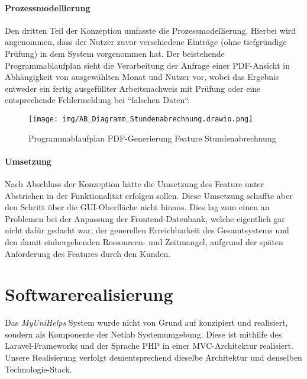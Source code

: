 \documentclass[12pt,a4paper]{scrartcl}
\newcommand{\italic}[1]{\textit{#1}}
\begin{document}
\paragraph*{Prozessmodellierung}

Den dritten Teil der Konzeption umfasste die Prozessmodellierung. Hierbei wird angenommen, dass der Nutzer zuvor verschiedene Einträge (ohne tiefgründige Prüfung) in dem System vorgenommen hat. Der beistehende Programmablaufplan sieht die Verarbeitung der Anfrage einer PDF-Ansicht in Abhängigkeit von ausgewählten Monat und Nutzer vor, wobei das Ergebnis entweder ein fertig ausgefüllter Arbeitsnachweis mit Prüfung oder eine entsprechende Fehlermeldung bei “falschen Daten“.

\begin{figure}[H]
	\centering
	\texttt{[image: img/AB\_Diagramm\_Stundenabrechnung.drawio.png]}
	\caption{Programmablaufplan PDF-Generierung Feature Stundenabrechnung}
	\label{fig:bpmn-process}
\end{figure}

\paragraph*{Umsetzung}

Nach Abschluss der Konzeption hätte die Umsetzung des Feature unter Abstrichen in der Funktionalität erfolgen sollen. Diese Umsetzung schaffte aber den Schritt über die GUI-Oberfläche nicht hinaus. Dies lag zum einen an Problemen bei der Anpassung der Frontend-Datenbank, welche eigentlich gar nicht dafür gedacht war, der generellen Erreichbarkeit des Gesamtsystems und den damit einhergehenden Ressourcen- und Zeitmangel, aufgrund der späten Anforderung des Features durch den Kunden.

\section{Softwarerealisierung}
\label{impl}
Das \italic{MyUniHelps} System wurde nicht von Grund auf konzipiert und realisiert, sondern als Komponente der Netlab Systemumgebung.
Diese ist mithilfe des Laravel-Frameworks und der Sprache PHP in einer MVC-Architektur \cite{Goll.2014} realisiert.
Unsere Realisierung verfolgt dementsprechend dieselbe Architektur und denselben Technologie-Stack.
\end{document}
